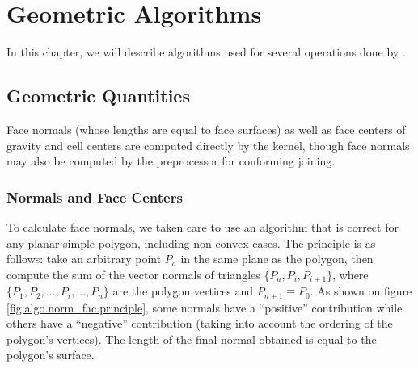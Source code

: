 
%
%
%
%


\nopagebreak
\section*{Geometric Algorithms\label{sec:algo}}

In this chapter, we will describe algorithms used for several
operations done by \CS.

\subsection*{Geometric Quantities\label{sec:geo_quant}}

Face normals (whose lengths are equal to face surfaces) as well
as face centers of gravity and cell centers are computed directly
by the kernel, though face normals may also be computed by the
preprocessor for conforming joining.

\subsubsection*{Normals and Face Centers%
                \label{sec:geo_quant.normal}}

To calculate face normals, we taken care to use an algorithm
that is correct for any planar simple polygon, including non-convex cases.
The principle is as follows: take an arbitrary point $P_a$ in the
same plane as the polygon, then compute the sum of the vector normals
of triangles $\{P_a, P_i, P_{i+1}\}$, where $\{P_1, P_2, ..., P_i, ..., P_n\}$
are the polygon vertices and $P_{n+1} \equiv P_0$. As shown on figure
\ref{fig:algo.norm_fac.principle}, some normals have a ``positive''
contribution while others have a ``negative'' contribution (taking into
account the ordering of the polygon's vertices). The length of the final normal
obtained is equal to the polygon's surface.

